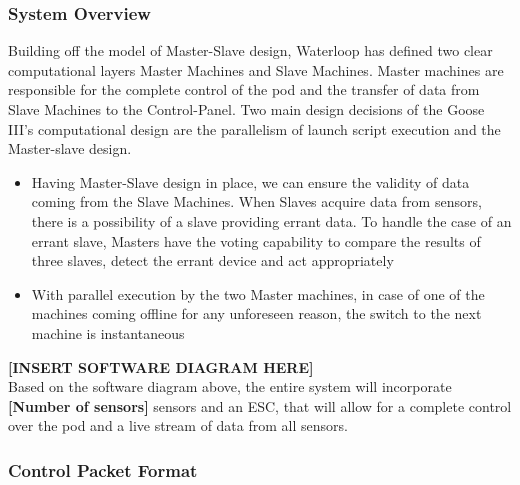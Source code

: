 \documentclass[main.tex]{subfiles}
\begin{document}
    \subsubsection{System Overview}
    Building off the model of Master-Slave design, Waterloop has defined two clear computational layers Master Machines and Slave Machines. Master machines are responsible for the complete control of the pod and the transfer of data from Slave Machines to the Control-Panel. Two main design decisions of the Goose III’s computational design are the parallelism of launch script execution and the Master-slave design.
    \begin{itemize}
        \item Having Master-Slave design in place, we can ensure the validity of data coming from the Slave Machines. When Slaves acquire data from sensors, there is a possibility of a slave providing errant data. To handle the case of an errant slave, Masters have the voting capability to compare the results of three slaves, detect the errant device and act appropriately
        \item With parallel execution by the two Master machines, in case of one of the machines coming offline for any unforeseen reason, the switch to the next machine is instantaneous
    \end{itemize}
    \textbf{[INSERT SOFTWARE DIAGRAM HERE]}\\
    Based on the software diagram above, the entire system will incorporate \textbf{[Number of sensors]} sensors and an ESC, that will allow for a complete control over the pod and a live stream of data from all sensors.
    \subsubsection{Control Packet Format}
\end{document}

